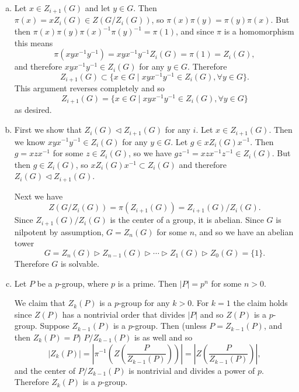 \documentclass{article}
\begin{document}
\begin{Answer}
\begin{enumerate}[(a)]
  \item{
    Let $x \in Z_{i+1}(G)$ and let $y \in G$. Then
    $\pi(x) = x Z_{i}(G) \in Z(G / Z_i(G))$,
    so $\pi(x) \pi(y) = \pi(y) \pi(x)$. But then
    $\pi(x)\pi(y)\pi(x)^{-1}\pi(y)^{-1} = \pi(1)$, and since $\pi$ is
    a homomorphism this means
    $$
      \pi(xyx^{-1}y^{-1})
    = xyx^{-1}y^{-1} Z_i(G)
    = \pi(1)
    = Z_i(G),
    $$
    and therefore $xyx^{-1}y^{-1} \in Z_i(G)$ for any $y \in
    G$. Therefore
    $$
    Z_{i+1}(G) \subset \{ x \in G
                         \mid
                         xyx^{-1}y^{-1} \in Z_i(G), \forall y \in G
                      \}.
    $$
    This argument reverses completely and so
    $$
    Z_{i+1}(G) =\{ x \in G
                  \mid
                  xyx^{-1}y^{-1} \in Z_i(G), \forall y \in G
               \}
    $$
    as desired.
  }
  \item{
    First we show that $Z_{i}(G) \triangleleft Z_{i+1}(G)$ for any
    $i$. Let $x \in Z_{i+1}(G)$. Then we know $xyx^{-1}y^{-1} \in
    Z_i(G)$ for any $y \in G$. Let $g \in x Z_{i}(G) x^{-1}$. Then
    $g = xzx^{-1}$ for some $z \in Z_{i}(G)$, so we have
    $gz^{-1} = xzx^{-1}z^{-1} \in Z_{i}(G)$. But then $g \in
    Z_{i}(G)$, so $x Z_{i}(G) x^{-1} \subset Z_{i}(G)$ and therefore
    $Z_{i}(G) \triangleleft Z_{i+1}(G)$.

    Next we have
    $$
      Z(G / Z_{i}(G))
    = \pi(Z_{i+1}(G))
    = Z_{i+1}(G) / Z_{i}(G).
    $$
    Since $Z_{i+1}(G) / Z_{i}(G)$ is the center of a group, it is
    abelian. Since $G$ is nilpotent by assumption, $G = Z_n(G)$ for
    some $n$, and so we have an abelian tower
    $$
    G = Z_n(G)
    \triangleright Z_{n-1}(G)
    \triangleright \cdots
    \triangleright Z_1(G)
    \triangleright Z_0(G) = \{ 1 \}.
    $$
    Therefore $G$ is solvable.
  }
  \item{
    Let $P$ be a $p$-group, where $p$ is a prime.
    Then $|P| = p^n$ for some $n > 0$.

    We claim that $Z_k(P)$ is a $p$-group for any $k > 0$.
    For $k = 1$ the claim holds since $Z(P)$ has a nontrivial order
    that divides $|P|$ and so $Z(P)$ is a $p$-group.
    Suppose $Z_{k-1}(P)$ is a $p$-group. Then (unless $P =
    Z_{k-1}(P)$, and then $Z_k(P) = P$) $P / Z_{k-1}(P)$ is as
    well and so
    $$
      |Z_k(P)|
    = \left|\pi^{-1}\left(Z\left(\frac{P}{Z_{k-1}(P)}\right)\right)\right|
    = \left|Z\left(\frac{P}{Z_{k-1}(P)}\right)\right|,
    $$
    and the center of $P / Z_{k-1}(P)$ is nontrivial and divides a
    power of $p$. Therefore $Z_k(P)$ is a $p$-group.

}
\end{enumerate}
\end{Answer}
\end{document}
